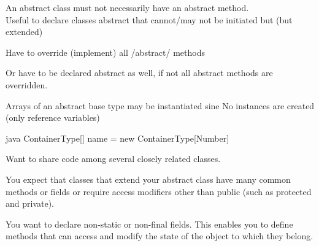 \begin{notebox}[Note]\nospacing
  An abstract class must not necessarily have an abstract method.\\
  Useful to declare classes abstract that cannot/may not be initiated but (but extended)
\end{notebox}
\begin{notebox}\nospacing
  \begin{itemizenosep}
      \item Have to override (implement) all \javainline/abstract/ methods
      \item Or have to be declared abstract as well, if not all abstract methods
    are overridden.
  \end{itemizenosep}
\end{notebox}
\begin{notebox}[Note]\nospacing
  Arrays of an abstract base type may be instantiated sine No instances are
  created (only reference variables)
  \begin{mintlinebox}{java}
    ContainerType[] name = new ContainerType[Number]
  \end{mintlinebox}
\end{notebox}
\begin{stylebox}[Usage]\nospacing
  \begin{itemizenosep}
      \item Want to share code among several closely related classes.
      \item You expect that classes that extend your abstract class have many
    common methods or fields or require access modifiers other than public (such
    as protected and private).
      \item You want to declare non-static or non-final fields. This enables you to define methods that can access and modify the state of the object to which they belong.
  \end{itemizenosep}
\end{stylebox}
